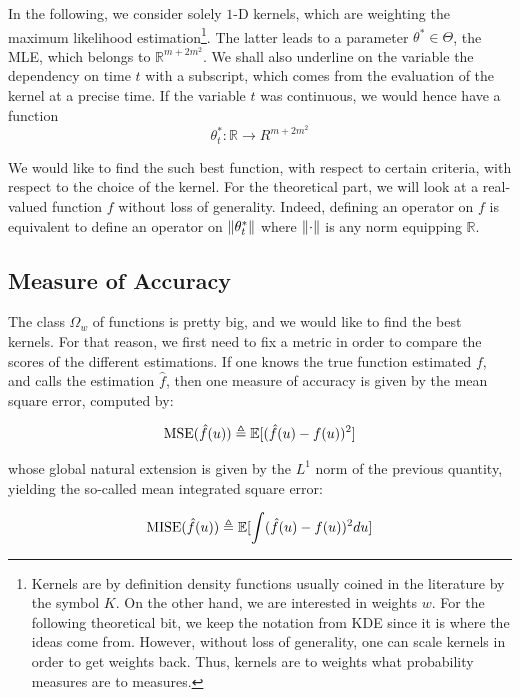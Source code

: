 \documentclass[11pt]{book}
\begin{document}
In the following, we consider solely $1$-D kernels, which are weighting the maximum likelihood estimation\footnote{Kernels are by definition density functions usually coined in the literature by the symbol $K$. On the other hand, we are interested in weights $w$. For the following theoretical bit, we keep the notation from KDE since it is where the ideas come from. However, without loss of generality, one can scale kernels in order to get weights back. Thus, kernels are to weights what probability measures are to measures\label{section:diff_kernel_weights}.}. The latter leads to a parameter $\theta^* \in \Theta$, the MLE, which belongs to $\mathbb R^{m+2 m^2}$. We shall also underline on the variable the dependency on time $t$ with a subscript, which comes from the evaluation of the kernel at a precise time. If the variable $t$ was continuous, we would hence have a function $$\theta^*_t \colon \mathbb R  \to R^{m+2 m^2} $$

We would like to find the such best function, with respect to certain criteria, with respect to the choice of the kernel. For the theoretical part, we will look at a real-valued function $f$ without loss of generality. Indeed, defining an operator on $f$ is equivalent to define an operator on $\lVert \theta^*_t\rVert$ where $\lVert \cdot\rVert$ is any norm equipping $\mathbb R$.
\label{section:multi_to_uni}
\label{section:kernel_to_weights}






\subsection{Measure of Accuracy}
The class $ \Omega_w $ of functions is pretty big, and we would like to find the best kernels. For that reason, we first need to fix a metric in order to compare the scores of the different estimations. If one knows the true function estimated $f$, and calls the estimation $\hat{f}$, then one measure of accuracy is given by the mean square error, computed by: 

\begin{equation}
\operatorname{MSE} ( \hat{f}(u) ) \triangleq  \mathbb E [ ( \hat{f}(u) - f(u) )^2 ]
\end{equation}

whose global natural extension is given by the $L^1$ norm of the previous quantity, yielding the so-called mean integrated square error:

\begin{equation}
\operatorname{MISE} ( \hat{f}(u) ) \triangleq  \mathbb E [ \int ( \hat{f}(u) - f(u) )^2 du ]
\end{equation}
\end{document}
